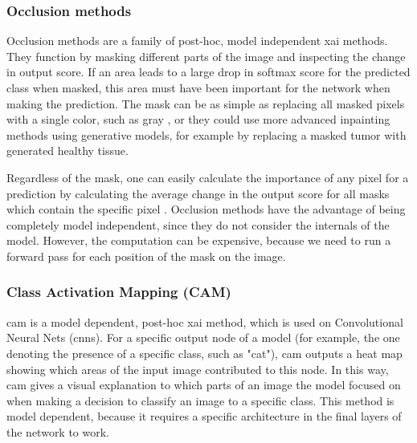 \documentclass[UKenglish]{uiomasterthesis} %
\theoremstyle{definition}
\begin{document}
\subsubsection{Occlusion methods}

Occlusion methods are a family of post-hoc, model independent \ac{xai} methods. They function by masking different parts of the image and inspecting the change in output score. If an area leads to a large drop in softmax score for the predicted class when masked, this area must have been important for the network when making the prediction. The mask can be as simple as replacing all masked pixels with a single color, such as gray \cite{occlusion}, or they could use more advanced inpainting methods using generative models, for example by replacing a masked tumor with generated healthy tissue. 

Regardless of the mask, one can easily calculate the importance of any pixel for a prediction by calculating the average change in the output score for all masks which contain the specific pixel \cite{diagnostic}. Occlusion methods have the advantage of being completely model independent, since they do not consider the internals of the model. However, the computation can be expensive, because we need to run a forward pass for each position of the mask on the image. %

\subsubsection{Class Activation Mapping (CAM)}

\ac{cam} \cite{cam} is a model dependent, post-hoc \ac{xai} method, which is used on Convolutional Neural Nets (\ac{cnn}s). For a specific output node of a model (for example, the one denoting the presence of a specific class, such as "cat"), \ac{cam} outputs a heat map showing which areas of the input image contributed to this node. In this way, \ac{cam} gives a visual explanation to which parts of an image the model focused on when making a decision to classify an image to a specific class. This method is model dependent, because it requires a specific architecture in the final layers of the network to work.
\end{document}
